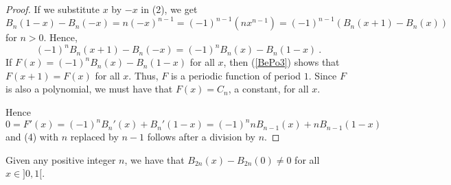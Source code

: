 \begin{proof}
 If we substitute $x$ by $-x$ in (2), we get
\[
B_n(1-x) - B_n(-x) = n(-x)^{n-1} = (-1)^{n-1}\left(nx^{n-1}\right)
= (-1)^{n-1} \left(B_n(x+1)-B_n(x)\right)
\]
for $n>0$.  Hence,
\begin{equation}\label{BePo3}
(-1)^n B_n(x+1) - B_n(-x)  = (-1)^n B_n(x) - B_n(1-x) \ .
\end{equation}
If $\displaystyle F(x) = (-1)^n B_n(x) - B_n(1-x)$ for all $x$,
then (\ref{BePo3}) shows that $F(x+1)=F(x)$ for all $x$.  Thus, $F$ is
a periodic function of period $1$.  Since $F$ is also a polynomial, we
must have that $F(x) = C_n$, a constant, for all $x$.

Hence
\[
0 = F'(x) = (-1)^n B_n'(x) + B_n'(1-x)
= (-1)^n n B_{n-1}(x) + n B_{n-1}(1-x)
\]
and (4) with $n$ replaced by $n-1$ follows after a division by $n$.
\end{proof}

\begin{lemma}
Given any positive integer $n$, we have that
$B_{2n}(x)-B_{2n}(0) \neq 0$ for all $x\in ]0,1[$.
\end{lemma}

